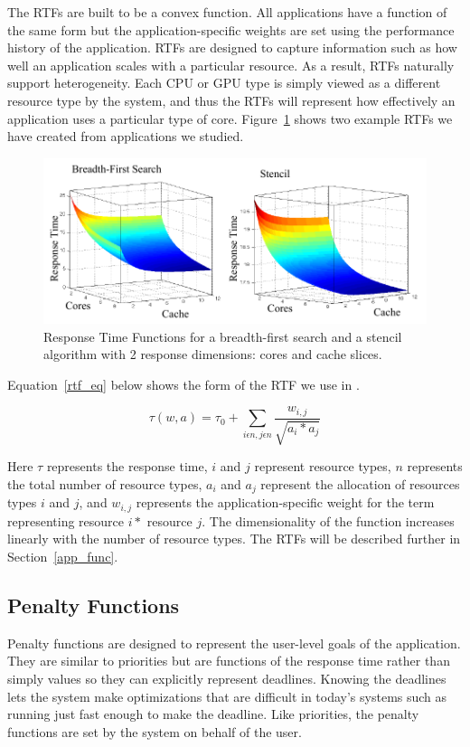 The RTFs are built to be a convex function.  All applications have a
function of the same form but the application-specific weights are set
using the performance history of the application.  RTFs are designed
to capture information such as how well an application scales with a
particular resource. As a result, RTFs naturally support
heterogeneity.  Each CPU or GPU type is simply viewed as a different
resource type by the system, and thus the RTFs will represent how
effectively an application uses a particular type of
core. Figure~\ref{sample_rtf} shows two example RTFs we have created
from applications we studied.

\begin{figure}[hb]
\includegraphics*[bb=0 0 426 184,width=1.0\columnwidth]{sample_rtf.pdf}
\caption{\label{sample_rtf} Response Time Functions for a breadth-first search and a stencil algorithm with 2 response dimensions: cores and cache slices.}
\end{figure}

Equation~\ref{rtf_eq} below shows the form of the RTF we use in \pacora.

\begin{equation}\label{rtf_eq}
\tau(w,a) = \tau_0 + \sum_{i\epsilon n,j\epsilon n}{\frac{w_{i,j}}{\sqrt{a_i * a_j}}}
\end{equation}

Here $\tau$ represents the response time, $i$ and $j$ represent resource types, $n$ represents the total number of resource types, $a_{i}$ and $a_{j}$ represent the allocation of resources types $i$ and $j$, and $w_{i,j}$ represents the application-specific weight for the term representing resource $i*$ resource $j$.  The dimensionality of the function increases linearly with the number of resource types. The RTFs will be described further in Section~\ref{app_func}.

\subsection*{Penalty Functions}
Penalty functions are designed to represent the user-level goals of the application. They are similar to priorities but are functions of the response time rather than simply values so they can explicitly represent deadlines.  Knowing the deadlines lets the system make optimizations that are difficult in today's systems such as running just fast enough to make the deadline. Like priorities, the penalty functions are set by the system on behalf of the user.

